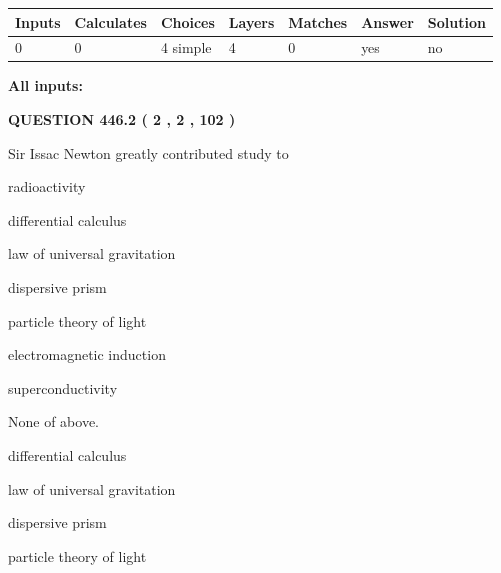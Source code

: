 \documentclass[12pt]{article}
\begin{document}
 
   
   
   
   
\noindent\begin{tabular}{|l|l|l|l|l|l|l|}
 \hline
Inputs & Calculates & Choices & Layers & Matches & Answer & Solution \\ \hline
 0  & 
 0  & 
 4
  simple  
  & 
 4  & 
 0  & 
  yes & 
  no 
  \\ \hline
 \end{tabular}
   
   
   
   
\noindent{}
   
   
   
   
\noindent\vspace{0.1in}\hspace{-0.08in} {\textbf{\Large{All inputs: }}}
   
   
  
\vspace{0.2in}
  
{\textbf{\Large{QUESTION
446.2 
 ( 2 , 2 , 102 )
}}}
  
  
Sir Issac Newton greatly contributed study to
 
 
radioactivity
 
 
differential calculus
 
 
law of universal gravitation
 
 
dispersive prism
 
 
particle theory of light
 
 
electromagnetic induction
 
 
superconductivity
 
 
 None of above.
 
 
\noindent{}
 
 
differential calculus
 
 
law of universal gravitation
 
 
dispersive prism
 
 
particle theory of light
 
\end{document}
